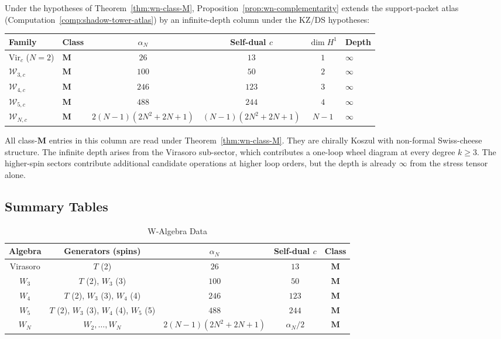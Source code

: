 \begin{remark}
\label{rem:wn-shadow-atlas}
%
Under the hypotheses of Theorem~\ref{thm:wn-class-M},
Proposition~\ref{prop:wn-complementarity}
extends the support-packet atlas
(Computation~\ref{comp:shadow-tower-atlas}) by
an infinite-depth column under the KZ/DS hypotheses:

\begin{center}
\small
\renewcommand{\arraystretch}{1.3}
\begin{tabular}{llcccl}
\toprule
\textbf{Family} & \textbf{Class}
 & $\alpha_N$ & Self-dual $c$ & $\dim H^1$ & \textbf{Depth} \\
\midrule
$\mathrm{Vir}_c$ ($N=2$) & $\mathbf{M}$
 & $26$ & $13$ & $1$ & $\infty$ \\
$\mathcal{W}_{3,c}$ & $\mathbf{M}$
 & $100$ & $50$ & $2$ & $\infty$ \\
$\mathcal{W}_{4,c}$ & $\mathbf{M}$
 & $246$ & $123$ & $3$ & $\infty$ \\
$\mathcal{W}_{5,c}$ & $\mathbf{M}$
 & $488$ & $244$ & $4$ & $\infty$ \\
$\mathcal{W}_{N,c}$ & $\mathbf{M}$
 & $2(N\!-\!1)(2N^2\!+\!2N\!+\!1)$
 & $(N\!-\!1)(2N^2\!+\!2N\!+\!1)$
 & $N\!-\!1$ & $\infty$ \\
\bottomrule
\end{tabular}
\end{center}

\noindent
All class-$\mathbf M$ entries in this column are read under
Theorem~\ref{thm:wn-class-M}. They are chirally Koszul with
non-formal Swiss-cheese structure. The infinite depth arises from the
Virasoro sub-sector, which contributes a one-loop wheel diagram
at every degree $k \ge 3$. The higher-spin sectors contribute
additional candidate operations at higher loop orders,
but the depth is already $\infty$ from the stress tensor alone.
\end{remark}

\subsection{Summary Tables}

\begin{table}[h]
\centering
\caption{W-Algebra Data}
\begin{tabular}{|c|c|c|c|c|}
\hline
Algebra & Generators (spins) & $\alpha_N$ & Self-dual $c$ & Class \\
\hline
Virasoro & $T$ (2) & $26$ & $13$ & $\mathbf{M}$ \\
$W_3$ & $T$ (2), $W_3$ (3) & $100$ & $50$ & $\mathbf{M}$ \\
$W_4$ & $T$ (2), $W_3$ (3), $W_4$ (4) & $246$ & $123$ & $\mathbf{M}$ \\
$W_5$ & $T$ (2), $W_3$ (3), $W_4$ (4), $W_5$ (5) & $488$ & $244$ & $\mathbf{M}$ \\
$W_N$ & $W_2, \ldots, W_N$ & $2(N\!-\!1)(2N^2\!+\!2N\!+\!1)$ & $\alpha_N/2$ & $\mathbf{M}$ \\
\hline
\end{tabular}
\end{table}

